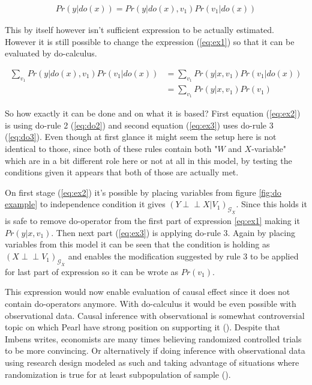 \documentclass[main=english,12pt,a4paper,pdftex,econ,utf8]{aaltothesis}
\newcommand{\indep}{\perp \!\!\! \perp}
\newcommand{\g}{\mathcal{G}}
\begin{document}


\begin{gather}
    Pr(y|do(x))=Pr(y|do(x),v_1)Pr(v_1|do(x)) \label{eq:ex1}
\end{gather}

\noindent This by itself however isn't sufficient expression to be actually estimated. However it is still possible to change the expression (\ref{eq:ex1}) so that it can be evaluated by do-calculus.

\begin{align}
    \sum_{v_1}Pr(y|do(x), v_1)Pr(v_1|do(x))&=\sum_{v_1}Pr(y|x, v_1)Pr(v_1|do(x)) \label{eq:ex2} \\
    &=\sum_{v_1}Pr(y|x, v_1)Pr(v_1) \label{eq:ex3}
\end{align}

So how exactly it can be done and on what it is based? First equation (\ref{eq:ex2}) is using do-rule 2 (\ref{eq:do2}) and second equation (\ref{eq:ex3}) uses do-rule 3 (\ref{eq:do3}). Even though at first glance it might seem the setup here is not identical to those, since both of these rules contain both "$W$ and $X$-variable" which are in a bit different role here or not at all in this model, by testing the conditions given it appears that both of those are actually met.

On first stage (\ref{eq:ex2}) it's possible by placing variables from figure \ref{fig:do example} to independence condition it gives $(Y \indep X|V_{1})_{\g_{\underline{X}}}$. Since this holds it is safe to remove do-operator from the first part of expression \ref{eq:ex1} making it $Pr(y|x,v_1)$. Then next part (\ref{eq:ex3}) is applying do-rule 3. Again by placing variables from this model it can be seen that the condition is holding as $(X\indep V_{1})_{\g_{\overline{X}}}$ and enables the modification suggested by rule 3 to be applied for last part of expression so it can be wrote as $Pr(v_{1})$.

This expression would now enable evaluation of causal effect since it does not contain do-operators anymore. With do-calculus it would be even possible with observational data. Causal inference with observational is somewhat controversial topic on which Pearl have strong position on supporting it (\cite{Pearl2018}). Despite that Imbens writes, economists are many times believing randomized controlled trials to be more convincing. Or alternatively if doing inference with observational data using research design modeled as such and taking advantage of situations where randomization is true for at least subpopulation of sample (\cite{imbes2020}).
\end{document}
